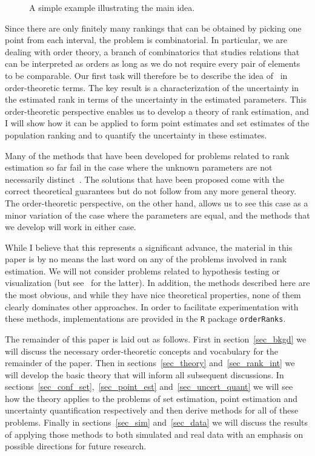 \documentclass[12pt]{article}
\numberwithin{theorem}{section}
\begin{document}
\begin{figure}[t]
\centering

\caption{A simple example illustrating the main idea.}
\label{fig_example}
\end{figure}

Since there are only finitely many rankings that can be obtained by picking one point from each interval, the problem is combinatorial.  In particular, we are dealing with order theory, a branch of combinatorics that studies relations that can be interpreted as orders as long as we do not require every pair of elements to be comparable.  Our first task will therefore be to describe the idea of~\cite{klein2020jointCR} in order-theoretic terms.  The key result is a characterization of the uncertainty in the estimated rank in terms of the uncertainty in the estimated parameters.  This order-theoretic perspective enables us to develop a theory of rank estimation, and I will show how it can be applied to form point estimates and set estimates of the population ranking and to quantify the uncertainty in these estimates.

Many of the methods that have been developed for problems related to rank estimation so far fail in the case where the unknown parameters are not necessarily distinct~\citep{hall2009bootstrap, xie2009ties}.  The solutions that have been proposed come with the correct theoretical guarantees but do not follow from any more general theory.  The order-theoretic perspective, on the other hand, allows us to see this case as a minor variation of the case where the parameters are equal, and the methods that we develop will work in either case.

While I believe that this represents a significant advance, the material in this paper is by no means the last word on any of the problems involved in rank estimation.  We will not consider problems related to hypothesis testing or visualization (but see~\cite{fattore2014visualizing} for the latter).  In addition, the methods described here are the most obvious, and while they have nice theoretical properties, none of them clearly dominates other approaches.  In order to facilitate experimentation with these methods, implementations are provided in the \texttt{R} package \texttt{orderRanks}.

The remainder of this paper is laid out as follows.  First in section~\ref{sec_bkgd} we will discuss the necessary order-theoretic concepts and vocabulary for the remainder of the paper.  Then in sections~\ref{sec_theory} and~\ref{sec_rank_int} we will develop the basic theory that will inform all subsequent discussions.  In sections~\ref{sec_conf_set},~\ref{sec_point_est} and~\ref{sec_uncert_quant} we will see how the theory applies to the problems of set estimation, point estimation and uncertainty quantification respectively and then derive methods for all of these problems.  Finally in sections~\ref{sec_sim} and~\ref{sec_data} we will discuss the results of applying those methods to both simulated and real data with an emphasis on possible directions for future research.
\end{document}
